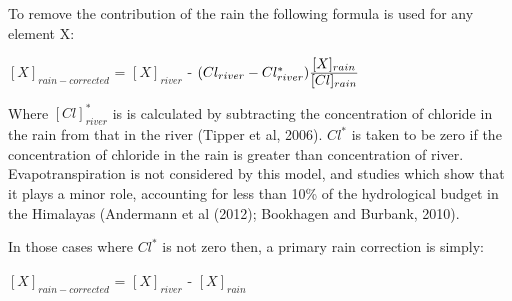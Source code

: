 \bsk

To remove the contribution of the rain the following formula is used for any element X:

\begin{center}
{\Large
$[X]_{rain-corrected}$  = $[X]_{river}$ - $(Cl_{river} - Cl^*_{river})\ddfrac{[X]_{rain}}{[Cl]_{rain}}$}

\end{center}

Where $[Cl]^*_{river}$ is is calculated by subtracting the concentration of chloride in the rain from that in the river (Tipper et al, 2006).
$Cl^{*}$ is taken to be zero if the concentration of chloride in the rain is greater than concentration of river. Evapotranspiration is not considered by this model, and
studies which show that it plays a minor role, accounting for less than 10\% of the hydrological budget in the Himalayas (Andermann et al (2012); Bookhagen and Burbank, 2010).










In those cases where $Cl^*$ is not zero then, a primary rain correction is simply:


\begin{center}
{\Large
$[X]_{rain-corrected}$  = $[X]_{river}$ - $[X]_{rain}$}

\end{center}

